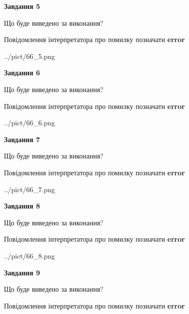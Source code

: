 \documentclass[11pt, ukrainian]{article}
\begin{document}
{\begin {large}
{\begin {center}\textbf{Завдання 5}\end {center}}\par
Що буде виведено за виконання? \par
Повідомлення інтерпретатора про помилку позначати \textbf{error}

\begin{center}
	{../pict/66_5.png}
\end{center}
\newpage

{\begin {center}\textbf{Завдання 6}\end {center}}\par
Що буде виведено за виконання? \par
Повідомлення інтерпретатора про помилку позначати \textbf{error}

\begin{center}
	{../pict/66_6.png}
\end{center}
\newpage

{\begin {center}\textbf{Завдання 7}\end {center}}\par
Що буде виведено за виконання? \par
Повідомлення інтерпретатора про помилку позначати \textbf{error}

\begin{center}
	{../pict/66_7.png}
\end{center}
\newpage

{\begin {center}\textbf{Завдання 8}\end {center}}\par
Що буде виведено за виконання? \par
Повідомлення інтерпретатора про помилку позначати \textbf{error}

\begin{center}
	{../pict/66_8.png}
\end{center}
\newpage

{\begin {center}\textbf{Завдання 9}\end {center}}\par
Що буде виведено за виконання? \par
Повідомлення інтерпретатора про помилку позначати \textbf{error}


\end{large}}
\end{document}
